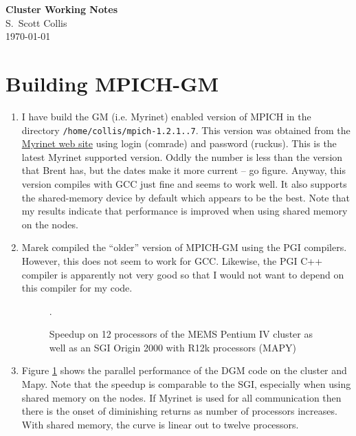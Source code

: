 \documentclass[10pt]{article}
\begin{document}
\begin{center}
{\bf Cluster Working Notes}\\
S.\ Scott Collis\\
\today
\end{center}

\section*{\normalsize Building MPICH-GM}

\begin{enumerate}

\item I have build the GM (i.e. Myrinet) enabled version of MPICH in the
directory {\tt /home/collis/mpich-1.2.1..7}.  This version was obtained from
the \href{http://www.myri.com/scs/#documentation}{Myrinet web site} using
login (comrade) and password (ruckus).  This is the latest Myrinet supported
version.  Oddly the number is less than the version that Brent has, but the
dates make it more current -- go figure.  Anyway, this version compiles with
GCC just fine and seems to work well.  It also supports the shared-memory
device by default which appears to be the best.  Note that my results indicate
that performance is improved when using shared memory on the nodes.

\item Marek compiled the ``older'' version of MPICH-GM using the PGI
compilers.  However, this does not seem to work for GCC.  Likewise, the PGI C++
compiler is apparently not very good so that I would not want to depend on
this compiler for my code.

\begin{figure}[bh]
\centering
\epsfxsize=3.5in
\caption{Speedup on 12 processors of the MEMS Pentium IV cluster as well as an
SGI Origin 2000 with R12k processors (MAPY)}.
\label{f:speedup}
\end{figure}

\item Figure \ref{f:speedup} shows the parallel performance of the DGM code on
the cluster and Mapy.  Note that the speedup is comparable to the SGI,
especially when using shared memory on the nodes.  If Myrinet is used for all
communication then there is the onset of diminishing returns as number of
processors increases.  With shared memory, the curve is linear out to twelve
processors.

\end{enumerate}
\end{document}
